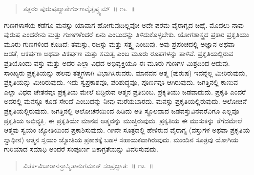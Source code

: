 \vspace{-0.3cm}

\begin{verse}
ತತ್ಪರಂ ಪುರುಷಖ್ಯಾತೇರ್ಗುಣವೈತೃಷ್ಣ್ಯಮ್​~॥ ೧೬~॥
\end{verse}

\vspace{-0.3cm}


ಗುಣಗಳಾಸೆಯ ಕಡೆಗೂ ಮನಸ್ಸು ಯಾವಾಗ ಹೋಗುವುದಿಲ್ಲವೋ ಅದೇ ಪರಮ ವೈರಾಗ್ಯದ ಚಿಹ್ನೆ. ಮೊದಲು ನಾವು ಪುರುಷ ಎಂದರೇನು ಮತ್ತು ಗುಣಗಳೆಂದರೆ ಏನು ಎಂಬುದನ್ನು ತಿಳಿದುಕೊಳ್ಳಬೇಕು. ಯೋಗಶಾಸ್ತ್ರದ ಪ್ರಕಾರ ಪ್ರಕೃತಿಯು ಮೂರು ಗುಣಗಳಿಂದ ಕೂಡಿದೆ: ತಮಸ್ಸು, ರಜಸ್ಸು ಮತ್ತು ಸತ್ತ್ವ ಎಂಬುವು. ಅವು ಪ್ರಪಂಚದಲ್ಲಿ ಅಜ್ಞಾನ ಅಥವಾ ಜಡತೆ, ಆಕರ್ಷಣ ಅಥವಾ ವಿಕರ್ಷಣ ಮತ್ತು ಸಮತ್ವ ಎಂಬ ಮೂರು ರೂಪಗಳನ್ನು ತಾಳಿವೆ. ಪ್ರಕೃತಿಯಲ್ಲಿರುವ ಪ್ರತಿಯೊಂದು ವಸ್ತು ಮತ್ತು ಅದರ ಎಲ್ಲಾ ವಿಧದ ಅಭಿವ್ಯಕ್ತಿಯೂ ಈ ಮೂರು ಗುಣಗಳ ಮಿಶ್ರದಿಂದ ಆದುವು. ಸಾಂಖ್ಯರು ಪ್ರಕೃತಿಯನ್ನು ಹಲವು ತತ್ತ್ವಗಳಾಗಿ ವಿಭಾಗಿಸಿರುವರು. ಮಾನವನ ಆತ್ಮ (ಪುರುಷ) ಇದನ್ನೆಲ್ಲ ಮೀರಿರುವುದು, ಪ್ರಕೃತಿಯನ್ನು ಮೀರಿರುವುದು. ಇದು ಸ್ವಪ್ರಕಾಶವೂ, ಪರಿಶುದ್ಧವೂ, ಪೂರ್ಣವೂ ಆಗಿರುವುದು. ಜಗತ್ತಿನಲ್ಲಿ ಕಾಣುವ ಎಲ್ಲಾ ವಿಧದ ಚೇತನವೂ ಪ್ರಕೃತಿಯ ಮೇಲೆ ಬಿದ್ದಿರುವ ಆತ್ಮನ ಪ್ರತಿಬಿಂಬ. ಪ್ರಕೃತಿಯು ಜಡವಾದುದು. ಪ್ರಕೃತಿ ಎಂದರೆ ಅದರಲ್ಲಿ ಮನಸ್ಸೂ ಕೂಡ ಸೇರಿದೆ ಎಂಬುದನ್ನು ನೀವು ಮರೆಯಬಾರದು. ಮನಸ್ಸು ಪ್ರಕೃತಿಯಲ್ಲಿರುವುದು. ಆಲೋಚನೆ ಪ್ರಕೃತಿಯಲ್ಲಿರುವುದು. ಜಗತ್ತಿನಲ್ಲಿ ಆಲೋಚನೆಯಿಂದ ಹಿಡಿದು ಅತಿ ಸ್ಥೂಲವಾದ ಜಡವಸ್ತುವಿನವರೆವಿಗೂ ಎಲ್ಲವೂ ಪ್ರಕೃತಿಯ ಅಭಿವ್ಯಕ್ತಿ. ಈ ಪ್ರಕೃತಿಯೇ ಮಾನವ ಆತ್ಮವನ್ನು ಮುಚ್ಚಿರುವುದು. ಪ್ರಕೃತಿಯ ಈ ಮುಸುಕನ್ನು ತೆಗೆದಮೇಲೆ ಆತ್ಮವು ಸ್ವಯಂ ಜ್ಯೋತಿಯಿಂದ ಪ್ರಕಾಶಿಸುವುದು. ೧೫ನೇ ಸೂತ್ರದಲ್ಲಿ ಹೇಳಿರುವ ವೈರಾಗ್ಯ (ವಸ್ತುಗಳ ಅಥವಾ ಪ್ರಕೃತಿಯ ಸ್ವಾಧೀನ) ಆತ್ಮನ ಸ್ವಯಂ ಜ್ಯೋತಿಯ ಪ್ರಕಾಶಕ್ಕೆ ಬಹಳ ಸಹಾಯಕವಾಗಿರುವುದು. ಮುಂದಿನ ಸೂತ್ರವು ಯೋಗಿಯ ಗುರಿಯಾದ ಸಮಾಧಿ ಅಂದರೆ ಸಂಪೂರ್ಣ ಏಕಾಗ್ರತೆಯನ್ನು ವಿವರಿಸುವುದು. 

\vspace{-0.2cm}

\begin{verse}
ವಿತರ್ಕವಿಚಾರಾನನ್ದಾಸ್ಮಿತಾನುಗಮಾತ್​ ಸಂಪ್ರಜ್ಞಾತಃ~॥ ೧೭~॥
\end{verse}

\vspace{-0.2cm}


